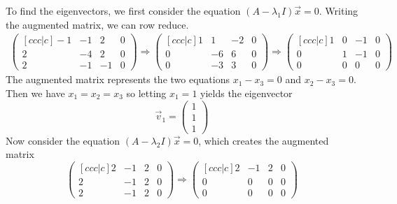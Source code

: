 \documentclass[11pt, titlepage]{article}
\begin{document}
\begin{enumerate}
    \begin{solution}
      To find the eigenvectors, we first consider the equation \((A - \lambda_{1} I) \vec{x} = 0\).
      Writing the augmented matrix, we can row reduce.
      \begin{align*}
        \begin{pmatrix}[ccc|c]
          -1 & -1 & 2 & 0\\
          2 & -4 & 2 & 0\\
          2 & -1 & -1 & 0
        \end{pmatrix}
        \Longrightarrow
        \begin{pmatrix}[ccc|c]
        1 & 1 & -2 & 0\\
        0 & -6 & 6 & 0\\
        0 & -3 & 3 & 0
      \end{pmatrix}
      \Longrightarrow
      \begin{pmatrix}[ccc | c]
        1 & 0 & -1 & 0 \\
        0 & 1 & -1 & 0 \\
        0 & 0 & 0 & 0
      \end{pmatrix}
      \end{align*}
      The augmented matrix represents the two equations
      \(x_{1} - x_{3} = 0\) and \(x_{2} - x_{3} = 0\).
      Then we have \(x_{1} = x_{2} = x_{3}\) so letting \(x_{1} = 1\) yields the eigenvector
      \begin{equation*}
        \vec{v}_{1} =
        \begin{pmatrix}
          1 \\
          1 \\
          1
        \end{pmatrix}
      \end{equation*}
      Now consider the equation \((A - \lambda_{2} I) \vec{x} = 0\), which creates the augmented matrix
      \begin{equation*}
        \begin{pmatrix}[ccc|c]
          2 & -1 & 2 & 0 \\
          2 & -1 & 2 & 0 \\
          2 & -1 & 2 & 0
        \end{pmatrix}
        \Longrightarrow
        \begin{pmatrix}[ccc|c]
          2 & -1 & 2 & 0 \\
          0 & 0 & 0 & 0 \\
          0 & 0 & 0 & 0
        \end{pmatrix}

\end{equation*}
\end{solution}
\end{enumerate}
\end{document}

